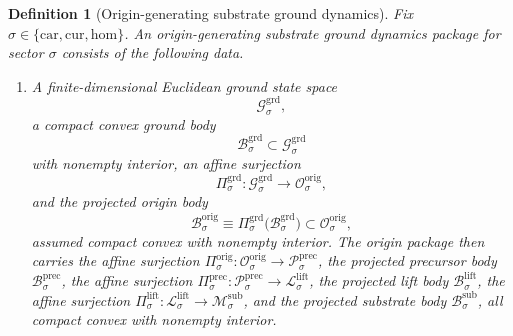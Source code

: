 \documentclass[11pt]{article}
\newcommand{\Car}{\mathrm{car}}
\newcommand{\Cur}{\mathrm{cur}}
\newcommand{\Hom}{\mathrm{hom}}
\newcommand{\SubSpace}[1]{\mathcal M_{#1}^{\mathrm{sub}}}
\newcommand{\SubBody}[1]{\mathcal B_{#1}^{\mathrm{sub}}}
\newcommand{\LiftSpace}[1]{\mathcal L_{#1}^{\mathrm{lift}}}
\newcommand{\LiftBody}[1]{\mathcal B_{#1}^{\mathrm{lift}}}
\newcommand{\LiftProj}[1]{\Pi_{#1}^{\mathrm{lift}}}
\newcommand{\PrecSpace}[1]{\mathcal P_{#1}^{\mathrm{prec}}}
\newcommand{\PrecBody}[1]{\mathcal B_{#1}^{\mathrm{prec}}}
\newcommand{\PrecProj}[1]{\Pi_{#1}^{\mathrm{prec}}}
\newcommand{\OrigSpace}[1]{\mathcal O_{#1}^{\mathrm{orig}}}
\newcommand{\OrigBody}[1]{\mathcal B_{#1}^{\mathrm{orig}}}
\newcommand{\OrigProj}[1]{\Pi_{#1}^{\mathrm{orig}}}
\newcommand{\GroundSpace}[1]{\mathcal G_{#1}^{\mathrm{grd}}}
\newcommand{\GroundBody}[1]{\mathcal B_{#1}^{\mathrm{grd}}}
\newcommand{\GroundProj}[1]{\Pi_{#1}^{\mathrm{grd}}}
\newtheorem{definition}{Definition}
\begin{document}
\begin{definition}[Origin-generating substrate ground dynamics]
\label{def:ground}
Fix \(\sigma\in\{\Car,\Cur,\Hom\}\). An \emph{origin-generating substrate ground dynamics package} for sector \(\sigma\) consists of the following data.
\begin{enumerate}
    \item A finite-dimensional Euclidean ground state space
    \[
    \GroundSpace{\sigma},
    \]
    a compact convex ground body
    \[
    \GroundBody{\sigma}\subset\GroundSpace{\sigma}
    \]
    with nonempty interior, an affine surjection
    \[
    \GroundProj{\sigma}:\GroundSpace{\sigma}\to\OrigSpace{\sigma},
    \]
    and the projected origin body
    \[
    \OrigBody{\sigma}
    \equiv
    \GroundProj{\sigma}\bigl(\GroundBody{\sigma}\bigr)
    \subset\OrigSpace{\sigma},
    \]
    assumed compact convex with nonempty interior. The origin package then carries the affine surjection \(\OrigProj{\sigma}:\OrigSpace{\sigma}\to\PrecSpace{\sigma}\), the projected precursor body \(\PrecBody{\sigma}\), the affine surjection \(\PrecProj{\sigma}:\PrecSpace{\sigma}\to\LiftSpace{\sigma}\), the projected lift body \(\LiftBody{\sigma}\), the affine surjection \(\LiftProj{\sigma}:\LiftSpace{\sigma}\to\SubSpace{\sigma}\), and the projected substrate body \(\SubBody{\sigma}\), all compact convex with nonempty interior.


\end{enumerate}
\end{definition}
\end{document}
